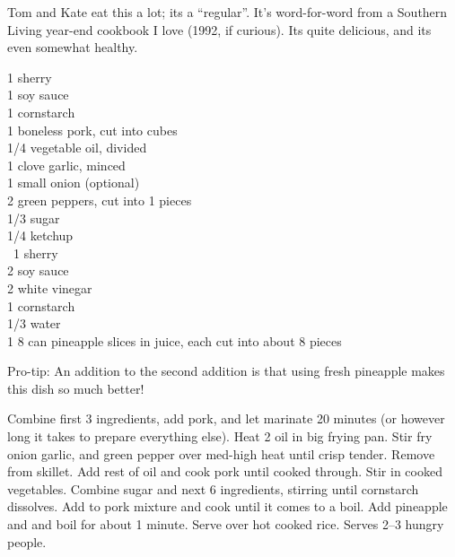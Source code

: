\begin{open}
  Tom and Kate eat this a lot; its a ``regular''. It's word-for-word from a
  Southern Living year-end cookbook I love (1992, if curious). Its quite
  delicious, and its even somewhat healthy.
\end{open}
\begin{ingredients}
  \SI{1}{\tblspoon} sherry\\
  \SI{1}{\tblspoon} soy sauce\\
  \SI{1}{\tblspoon} cornstarch\\
  \SI{1}{\pound} boneless pork, cut into cubes\\
  \SI{1/4}{\cup} vegetable oil, divided\\
  1 clove garlic, minced\\
  1 small onion (optional)\\
  2 green peppers, cut into \SI{1}{\inch} pieces\\
  \SI{1/3}{\cup} sugar\\
  \SI{1/4}{\cup} ketchup\\\
  \SI{1}{\tblspoon} sherry\\
  \SI{2}{\tblspoon} soy sauce\\
  \SI{2}{\tblspoon} white vinegar\\
  \SI{1}{\tblspoon} cornstarch\\
  \SI{1/3}{\cup} water\\
  1 \SI{8}{\ounce} can pineapple slices in juice, each cut into about 8 pieces
\end{ingredients}

\noindent Pro-tip: An addition to the second addition is that using fresh pineapple makes this dish so much better!

Combine first 3 ingredients, add pork, and let marinate 20 minutes (or
however long it takes to prepare everything else). Heat \SI{2}{\tblspoon} oil
in big frying pan.  Stir fry onion garlic, and green pepper over med-high heat
until crisp tender.  Remove from skillet. Add rest of oil and cook pork until
cooked through.  Stir in cooked vegetables. Combine sugar and next 6
ingredients, stirring until cornstarch dissolves. Add to pork mixture and cook
until it comes to a boil. Add pineapple and and boil for about
1 minute. Serve over hot cooked rice. Serves \numrange{2}{3} hungry
people.